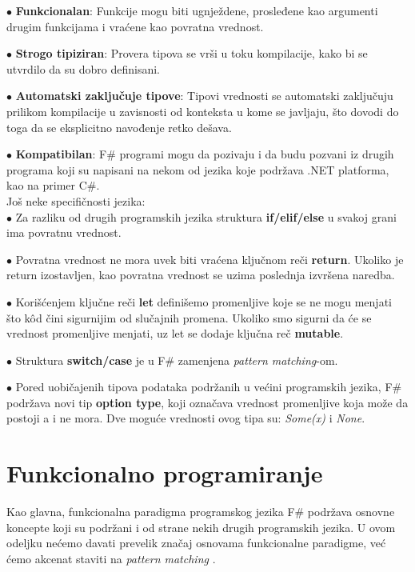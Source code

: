 \documentclass[a4paper]{article}
\begin{document}
	$\bullet$ \textbf{Funkcionalan}: Funkcije mogu biti ugnježdene, prosleđene kao argumenti drugim funkcijama i vraćene kao povratna vrednost.

	$\bullet$ \textbf{Strogo tipiziran}: Provera tipova se vrši u toku kompilacije, kako bi se utvrdilo da su dobro definisani. 

	$\bullet$ \textbf{Automatski zaključuje tipove}: Tipovi vrednosti se automatski zaključuju prilikom kompilacije u zavisnosti od konteksta u kome se javljaju, što dovodi do toga da se eksplicitno navođenje retko dešava.

	$\bullet$ \textbf{Kompatibilan}: F\# programi mogu da pozivaju i da budu pozvani iz drugih programa koji su napisani na nekom od jezika koje podržava .NET platforma, kao na primer C\#\cite{microsoft_c}. 
\\
 
	Još neke specifičnosti jezika: \\
	
	$\bullet$ Za razliku od drugih programskih jezika struktura \textbf{if/elif/else} u svakoj grani ima povratnu vrednost.
	 
	$\bullet$ Povratna vrednost ne mora uvek biti vraćena ključnom reči \textbf{return}. Ukoliko je return izostavljen, kao povratna vrednost se uzima poslednja izvršena naredba.
	 
	$\bullet$ Korišćenjem ključne reči \textbf{let} definišemo promenljive koje se ne mogu menjati što kôd čini sigurnijim od slučajnih promena. Ukoliko smo sigurni da će se vrednost promenljive menjati, uz let se dodaje ključna reč \textbf{mutable}.
	 
	$\bullet$ Struktura \textbf{switch/case} je u F\# zamenjena {\em pattern matching}-om\cite{expertFS}.
	 
$\bullet$ Pored uobičajenih tipova podataka podržanih u većini programskih jezika, F\# podržava novi tip \textbf{option type}, koji označava vrednost promenljive koja može da postoji a i ne mora. Dve moguće vrednosti ovog tipa su: {\em Some(x)} i {\em None}.

\section{Funkcionalno programiranje}


Kao glavna, funkcionalna paradigma programskog jezika F\# podržava osnovne koncepte koji su podržani i od strane nekih drugih programskih jezika. U ovom odeljku nećemo davati prevelik značaj osnovama funkcionalne paradigme, već ćemo akcenat staviti na {\em pattern matching} \cite{expertFS}.
\end{document}
